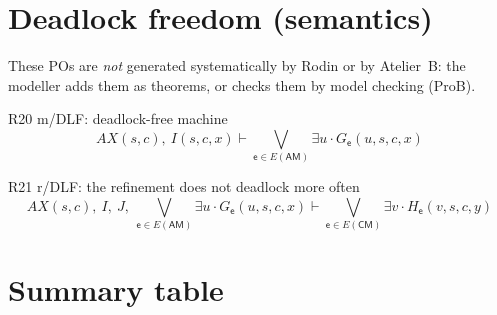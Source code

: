 \documentclass[11pt,a4paper]{article}
\newcommand{\AX}{\mathit{AX}(s,c)}
\newcommand{\sff}[1]{\textsf{#1}}
\newcommand{\po}[1]{\textsf{\small #1}}
\begin{document}
\section{Deadlock freedom (semantics)}

These POs are \emph{not} generated systematically by Rodin or by Atelier~B: the
modeller adds them as theorems, or checks them by model checking (ProB).

\begin{regle}{R20 \quad \po{m/DLF}: deadlock-free machine}
  \[ \AX,\ I(s,c,x) \vdash \bigvee_{\sff{e}\in E(\mathsf{AM})} \exists u\cdot G_{\sff{e}}(u,s,c,x) \]
\end{regle}
\begin{regle}{R21 \quad \po{r/DLF}: the refinement does not deadlock more often}
  \[ \AX,\ I,\ J,\ \bigvee_{\sff{e}\in E(\mathsf{AM})} \exists u\cdot G_{\sff{e}}(u,s,c,x)
     \vdash \bigvee_{\sff{e}\in E(\mathsf{CM})} \exists v\cdot H_{\sff{e}}(v,s,c,y) \]
\end{regle}

\section{Summary table}
\end{document}

